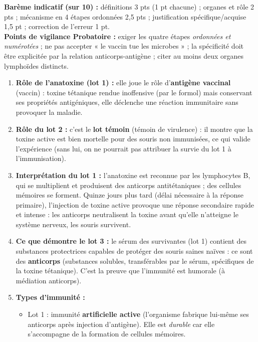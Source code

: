 \documentclass[11pt]{article}
\newcommand{\cle}[1]{{\popxbold\color{popdark}#1}}
\begin{document}
\begin{corrige}
\begin{enumerate}
\end{enumerate}
\textbf{Barème indicatif (sur 10) :} définitions 3 pts (1 pt chacune) ; organes et rôle 2 pts ; mécanisme en 4 étapes ordonnées 2,5 pts ; justification spécifique/acquise 1,5 pt ; correction de l'erreur 1 pt.\\
\textbf{Points de vigilance Probatoire :} exiger les quatre étapes \emph{ordonnées et numérotées} ; ne pas accepter « le vaccin tue les microbes » ; la spécificité doit être explicitée par la relation anticorps-antigène ; citer au moins deux organes lymphoïdes distincts.
\end{corrige}

\begin{corrige}
\begin{enumerate}
\item \textbf{Rôle de l'anatoxine (lot 1) :} elle joue le rôle d'\textbf{antigène vaccinal} (vaccin) : toxine tétanique rendue inoffensive (par le formol) mais conservant ses propriétés antigéniques, elle déclenche une réaction immunitaire sans provoquer la maladie.
\item \textbf{Rôle du lot 2 :} c'est le \textbf{lot témoin} (témoin de virulence) : il montre que la toxine active est bien mortelle pour des souris non immunisées, ce qui valide l'expérience (sans lui, on ne pourrait pas attribuer la survie du lot 1 à l'immunisation).
\item \textbf{Interprétation du lot 1 :} l'anatoxine est reconnue par les lymphocytes B, qui se multiplient et produisent des anticorps antitétaniques ; des \cle{cellules mémoires} se forment. Quinze jours plus tard (délai nécessaire à la réponse primaire), l'injection de toxine active provoque une \cle{réponse secondaire} rapide et intense : les anticorps neutralisent la toxine avant qu'elle n'atteigne le système nerveux, les souris survivent.
\item \textbf{Ce que démontre le lot 3 :} le sérum des survivantes (lot 1) contient des substances protectrices capables de protéger des souris saines naïves : ce sont des \textbf{anticorps} (substances solubles, transférables par le sérum, spécifiques de la toxine tétanique). C'est la preuve que l'immunité est humorale (à médiation anticorps).
\item \textbf{Types d'immunité :}
\begin{itemize}
\item Lot 1 : immunité \textbf{artificielle active} (l'organisme fabrique lui-même ses anticorps après injection d'antigène). Elle est \emph{durable} car elle s'accompagne de la formation de cellules mémoires.

\end{itemize}
\end{enumerate}
\end{corrige}
\end{document}
